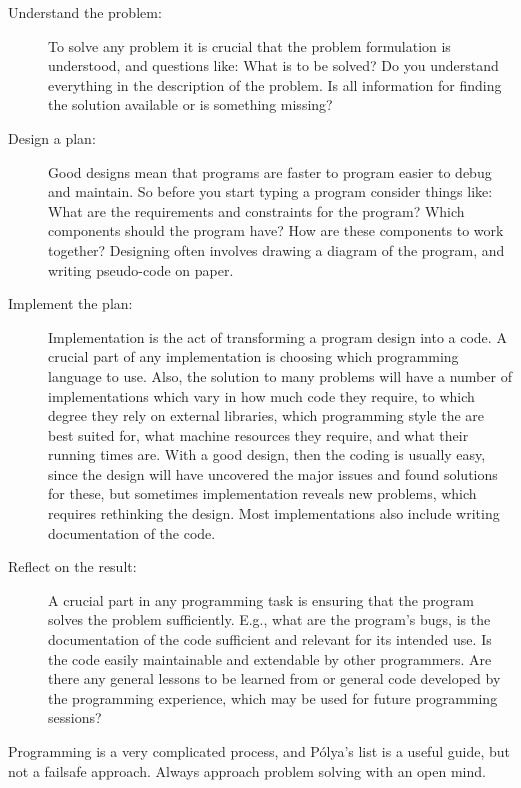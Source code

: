 \begin{description}
\item[Understand the problem:] To solve any problem it is crucial that the problem formulation is understood, and questions like: What is to be solved? Do you understand everything in the description of the problem. Is all information for finding the solution available or is something missing?
\item[Design a plan:] Good designs mean that programs are faster to program easier to debug and maintain. So before you start typing a program consider things like: What are the requirements and constraints for the program? Which components should the program have? How are these components to work together? Designing often involves drawing a diagram of the program, and writing pseudo-code on paper.
\item[Implement the plan:] Implementation is the act of transforming a program design into a code. A crucial part of any implementation is choosing which programming language to use. Also, the solution to many problems will have a number of implementations which vary in how much code they require, to which degree they rely on external libraries, which programming style the are best suited for, what machine resources they require, and what their running times are.  With a good design, then the coding is usually easy, since the design will have uncovered the major issues and found solutions for these, but sometimes implementation reveals new problems, which requires rethinking the design. Most implementations also include writing documentation of the code.
\item[Reflect on the result:] A crucial part in any programming task is ensuring that the program solves the problem sufficiently. E.g., what are the program's bugs, is the documentation of the code sufficient and relevant for its intended use. Is the code easily maintainable and extendable by other programmers. Are there any general lessons to be learned from or general code developed by the programming experience, which may be used for future programming sessions?
\end{description}
Programming is a very complicated process, and Pólya's list is a useful guide, but not a failsafe approach. Always approach problem solving with an open mind.

